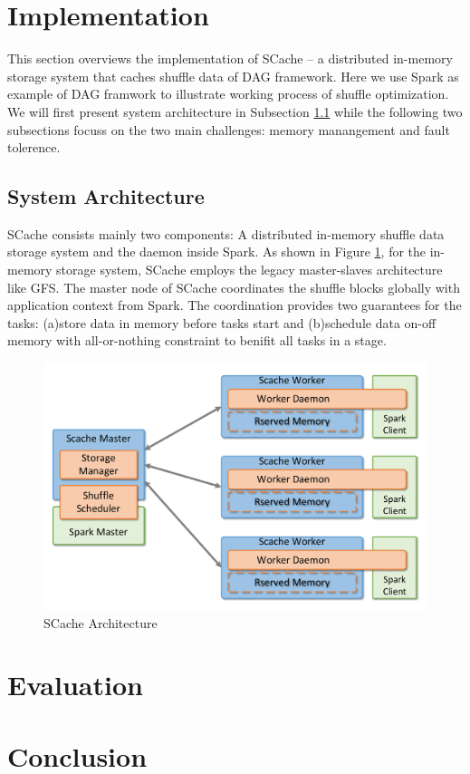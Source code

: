 \documentclass[10pt,twocolumn]{article}
\begin{document}
\section{Implementation}\label{impl}
This section overviews the implementation of SCache -- a distributed in-memory storage system that caches shuffle data of DAG framework. Here we use Spark as example of DAG framwork to illustrate working process of shuffle optimization. We will first present system architecture in Subsection \ref{arch} while the following two subsections focuss on the two main challenges: memory manangement and fault tolerence.
\subsection{System Architecture}\label{arch}
SCache consists mainly two components: A distributed in-memory shuffle data storage system and the daemon inside Spark. As shown in Figure \ref{fig:arch}, for the in-memory storage system, SCache employs the legacy master-slaves architecture like GFS\cite{gfs}. The master node of SCache coordinates the shuffle blocks globally with application context from Spark. The coordination provides two guarantees for the tasks: (a)store data in memory before tasks start and (b)schedule data on-off memory with all-or-nothing constraint to benifit all tasks in a stage.
\begin{figure}
	\centering
	\includegraphics[width=\linewidth]{fig/arch}
	\caption{SCache Architecture}
	\label{fig:arch}
\end{figure}
\section{Evaluation}\label{evaluation}

\section{Conclusion}





\end{document}

